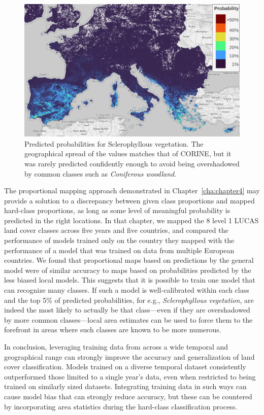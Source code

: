         \begin{figure}[H]
        \centering
        \includegraphics[width=1\linewidth]{figs_06/sclerophyllous.png}
        \caption{Predicted probabilities for Sclerophyllous vegetation. The geographical spread of the values matches that of CORINE, but it was rarely predicted confidently enough to avoid being overshadowed by common classes such as \textit{Coniferous woodland}.}
        \label{fig:sclerophyllous}
        \end{figure}
        
        The proportional mapping approach demonstrated in Chapter\@~\ref{cha:chapter4} may provide a solution to a discrepancy between given class proportions and mapped hard-class proportions, as long as some level of meaningful probability is predicted in the right locations. In that chapter, we mapped the 8 level 1 LUCAS land cover classes across five years and five countries, and compared the performance of models trained only on the country they mapped with the performance of a model that was trained on data from multiple European countries. We found that proportional maps based on predictions by the general model were of similar accuracy to maps based on probabilities predicted by the less biased local models. This suggests that it is possible to train one model that can recognize many classes. If such a model is well-calibrated within each class and the top 5\% of predicted probabilities, for e.g., \textit{Sclerophyllous vegetation}, are indeed the most likely to actually be that class---even if they are overshadowed by more common classes---local area estimates can be used to force them to the forefront in areas where such classes are known to be more numerous. 

        In conclusion, leveraging training data from across a wide temporal and geographical range can strongly improve the accuracy and generalization of land cover classification. Models trained on a diverse temporal dataset consistently outperformed those limited to a single year's data, even when restricted to being trained on similarly sized datasets. Integrating training data in such ways can cause model bias that can strongly reduce accuracy, but these can be countered by incorporating area statistics during the hard-class classification process.
        
